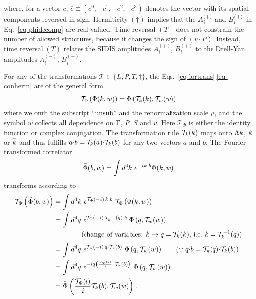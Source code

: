 where, for a vector $c$, $\overline{c} \equiv (c^0, -c^1, -c^2, -c^3)$ denotes the vector with its spatial components reversed in sign. Hermiticity $(\dagger)$ implies that the $A^{(+)}_i$ and $B^{(+)}_i$ in Eq.\ \eqref{eq-phidecomp} are real valued. Time reversal $(T)$ does not constrain the number of allowed structures, because it changes the sign of $(v\cdot P)$. Instead, time reversal $(T)$ relates the SIDIS amplitudes $A_i^{(+)}$, $B_i^{(+)}$ to the Drell-Yan amplitudes $A_i^{(-)}$, $B_i^{(-)}$.
	
For any of the transformations $\mathcal{T} \in \{ L, P, T, \dagger \}$, the Eqs.\ \eqref{eq-lortrans}-\eqref{eq-conherm} are of the general form 
\begin{equation}
	\mathcal{T}_\Phi\left(\Phi(k,w)\right) = \Phi\left(\mathcal{T}_k(k),\mathcal{T}_w(w)\right)
\end{equation}
where we omit the subscript ``unsub'' and the renormalization scale $\mu$, and the symbol $w$ collects all dependence on $\Gamma$, $P$, $S$ and $v$. Here $\mathcal{T}_\Phi$ is either the identity function or complex conjugation. The transformation rule $\mathcal{T}_k(k)$ maps onto $\Lambda k$, $k$ or $\overline{k}$ and thus fulfills $a {\cdot} b = \mathcal{T}_k(a) {\cdot} \mathcal{T}_k(b)$ for any two vectors $a$ and $b$. The Fourier-transformed correlator 
\begin{equation}
	\widetilde{\Phi}(\elll,w) =  \int d^4 \kei \ e^{-i \kei \tcdot \elll} \Phi(\kei, w)
\end{equation}
transforms according to
\begin{align}
	\mathcal{T}_\Phi\left(\widetilde{\Phi}(\elll,w) \right) & =  \int d^4 \kei \ e^{\mathcal{T}_\Phi(-i)\, \kei \tcdot \elll}\ \mathcal{T}_\Phi \left( \Phi(\kei, w) \right) \nonumber \\
	& =  \int d^4 q \ e^{\mathcal{T}_\Phi(-i)\, \mathcal{T}^{-1}_\kei(q) \tcdot \elll} \ \Phi\left(q, \mathcal{T}_w( w) \right) \nonumber \\
	& \qquad\qquad \text{(change of variables: $\kei\rightarrow q=\mathcal{T}_\kei(\kei)$, i.e.\ $\kei=\mathcal{T}^{-1}_\kei(q)$)}  \nonumber \\
	& =  \int d^4 q \ e^{\mathcal{T}_\Phi(-i)\, q \tcdot \mathcal{T}_\kei(\elll)} \ \Phi\left(q, \mathcal{T}_w( w) \right) \qquad (\because q \tcdot b = \mathcal{T}_\kei(q) \tcdot \mathcal{T}_\kei(b)) \nonumber \\
    & =  \int d^4 q \ e^{-iq\left(\frac{\mathcal{T}_\Phi(i)}{i}\,  \tcdot \mathcal{T}_\kei(\elll)\right)} \ \Phi\left(q, \mathcal{T}_w( w) \right)\nonumber \\
	& = \widetilde{\Phi}\left( \frac{\mathcal{T}_\Phi(i)}{i} \mathcal{T}_\kei(\elll), \mathcal{T}_w(w) \right)\, .
	\label{eq-phitildetrafo}
\end{align}

